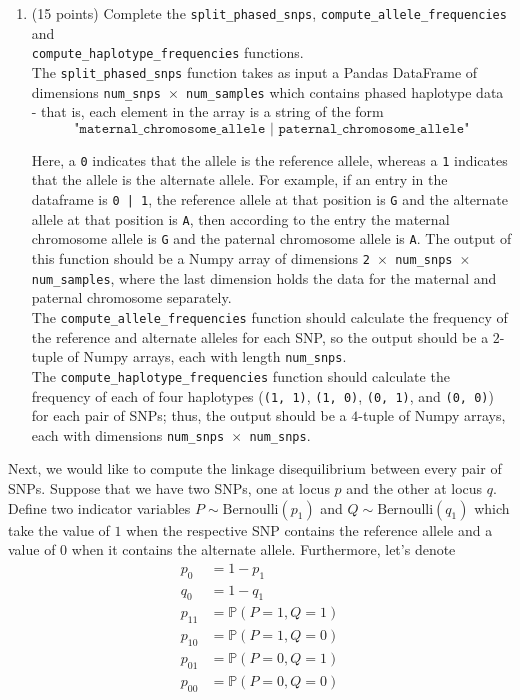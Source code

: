 \begin{enumerate}
    \item (15 points) Complete the \texttt{split\_phased\_snps},
    \texttt{compute\_allele\_frequencies} and \\
    \texttt{compute\_haplotype\_frequencies} functions. \\
    
    The \texttt{split\_phased\_snps} function takes as input a Pandas DataFrame of dimensions \texttt{num\_snps $\times$ num\_samples} which contains phased haplotype data - that is, each element in the array is a string of the form 
    $$\texttt{"maternal\_chromosome\_allele | paternal\_chromosome\_allele"}$$
    
    Here, a \texttt{0} indicates that the allele is the reference allele, whereas a \texttt{1} indicates that the allele is the alternate allele. For example, if an entry in the dataframe is \texttt{0 | 1}, the reference allele at that position is \texttt{G} and the alternate allele at that position is \texttt{A}, then according to the entry the maternal chromosome allele is \texttt{G} and the paternal chromosome allele is \texttt{A}. The output of this function should be a Numpy array of dimensions \texttt{2 $\times$ num\_snps $\times$ num\_samples}, where the last dimension holds the data for the maternal and paternal chromosome separately.\\
    
    The \texttt{compute\_allele\_frequencies} function should calculate the frequency of the reference and alternate alleles for each SNP, so the output should be a $2$-tuple of Numpy arrays, each with length \texttt{num\_snps}. \\
    
    The \texttt{compute\_haplotype\_frequencies} function should calculate the frequency of each of four haplotypes (\texttt{(1, 1)}, \texttt{(1, 0)}, \texttt{(0, 1)}, and \texttt{(0, 0)}) for each pair of SNPs; thus, the output should be a $4$-tuple of Numpy arrays, each with dimensions \texttt{num\_snps $\times$ num\_snps}.

\end{enumerate}        
    Next, we would like to compute the linkage disequilibrium between every pair of SNPs. Suppose that we have two SNPs, one at locus $p$ and the other at locus $q$. Define two indicator variables $P \sim \text{Bernoulli}(p_1)$ and $Q\sim \text{Bernoulli}(q_1)$ which take the value of $1$ when the respective SNP contains the reference allele and a value of $0$ when it contains the alternate allele. Furthermore, let's denote \begin{align*}
        p_0 &= 1 - p_1 \\
        q_0 &= 1 - q_1 \\
        p_{11} &= \mathbb{P}(P = 1, Q = 1) \\
        p_{10} &= \mathbb{P}(P = 1, Q = 0) \\
        p_{01} &= \mathbb{P}(P = 0, Q = 1) \\
        p_{00} &= \mathbb{P}(P = 0, Q = 0)
    \end{align*}

